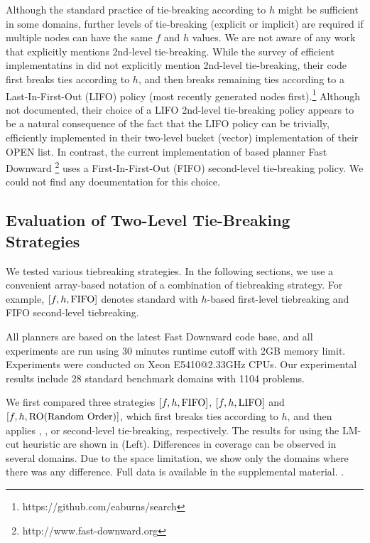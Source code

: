 Although the standard practice of tie-breaking according to $h$ might be sufficient in some domains, further levels of tie-breaking (explicit or implicit) are required if multiple nodes can have the same $f$ and $h$ values.
We are not aware of any work that explicitly mentions 2nd-level tie-breaking.
While the survey of efficient \astar implementatins in \citeauthor{burns2012implementing} did not explicitly mention 2nd-level tie-breaking, their code first breaks ties according to $h$, and then breaks remaining ties according to a Last-In-First-Out (LIFO) policy (most recently generated nodes first).\footnote{https://github.com/eaburns/search}
Although not documented, their choice of a LIFO 2nd-level tie-breaking policy appears to be a natural consequence of the fact that the LIFO policy can be trivially, efficiently implemented in their two-level bucket (vector) implementation of their OPEN list.
In contrast, the current implementation of \sota \astar based planner Fast
Downward \cite{Helmert2006}\footnote{http://www.fast-downward.org} uses a First-In-First-Out (FIFO) second-level tie-breaking policy. We could not find any documentation for this choice. 


\subsection{Evaluation of Two-Level Tie-Breaking Strategies}


We tested various tiebreaking strategies. In the following sections, we
use a convenient array-based notation of a combination of tiebreaking
strategy.  For example, $[f,h,\mbox{FIFO}]$ denotes standard \astar with
$h$-based first-level tiebreaking and FIFO
second-level tiebreaking.

All planners are based on the latest Fast Downward code base, and all
experiments are run using 30 minutes runtime cutoff with 2GB memory
limit. Experiments were conducted on Xeon E5410@2.33GHz CPUs.
Our experimental results include 28 standard benchmark domains with 1104
problems.

We first compared three strategies 
$[f,h,\mbox{FIFO}]$, $[f,h,\mbox{LIFO}]$ and $[f,h,\mbox{RO}\mbox{(Random Order)}]$, 
which first breaks ties according to $h$, and then applies \fifo, \lifo, or \ro second-level tie-breaking, respectively.
The results for \astar using the LM-cut heuristic \cite{Helmert2009} are shown 
 in  (Left).  Differences in coverage can be observed in several domains.
Due to the space limitation, we show only the domains
where there was any difference. Full data is available in the
supplemental material. .


